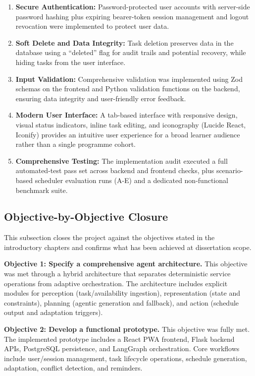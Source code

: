 \documentclass[12pt]{article}
\begin{document}
\begin{enumerate}
    \item \textbf{Secure Authentication:} Password-protected user accounts with server-side password hashing plus expiring bearer-token session management and logout revocation were implemented to protect user data.
    
    \item \textbf{Soft Delete and Data Integrity:} Task deletion preserves data in the database using a ``deleted'' flag for audit trails and potential recovery, while hiding tasks from the user interface.
    
    \item \textbf{Input Validation:} Comprehensive validation was implemented using Zod schemas on the frontend and Python validation functions on the backend, ensuring data integrity and user-friendly error feedback.
    
    \item \textbf{Modern User Interface:} A tab-based interface with responsive design, visual status indicators, inline task editing, and iconography (Lucide React, Iconify) provides an intuitive user experience for a broad learner audience rather than a single programme cohort.
    
    \item \textbf{Comprehensive Testing:} The implementation audit executed a full automated-test pass set across backend and frontend checks, plus scenario-based scheduler evaluation runs (A-E) and a dedicated non-functional benchmark suite.
\end{enumerate}

\subsection{Objective-by-Objective Closure}
This subsection closes the project against the objectives stated in the introductory chapters and confirms what has been achieved at dissertation scope.

\textbf{Objective 1: Specify a comprehensive agent architecture.} This objective was met through a hybrid architecture that separates deterministic service operations from adaptive orchestration. The architecture includes explicit modules for perception (task/availability ingestion), representation (state and constraints), planning (agentic generation and fallback), and action (schedule output and adaptation triggers).

\textbf{Objective 2: Develop a functional prototype.} This objective was fully met. The implemented prototype includes a React PWA frontend, Flask backend APIs, PostgreSQL persistence, and LangGraph orchestration. Core workflows include user/session management, task lifecycle operations, schedule generation, adaptation, conflict detection, and reminders.
\end{document}
